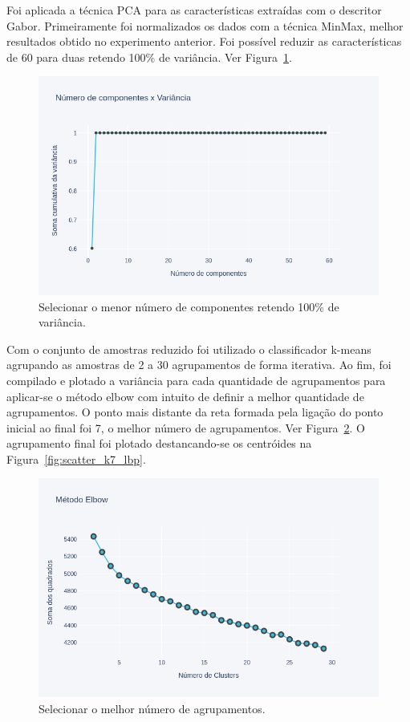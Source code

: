 \documentclass[a4paper, 12 pt, conference]{ieeeconf}  %
\begin{document}
Foi aplicada a técnica PCA para as características extraídas com o descritor Gabor. Primeiramente foi normalizados os dados com a técnica MinMax, melhor resultados obtido no experimento anterior. Foi possível reduzir as características de 60 para duas retendo 100\% de variância. Ver  Figura~\ref{fig:points_pca_gabor}.

\begin{figure}[!htbp]
	\centering
	\includegraphics[width=1.0\linewidth,clip=true,trim=0cm 0cm 0cm 0cm, keepaspectratio=true]{points_pca_gabor.png}
	\caption{Selecionar o menor número de componentes retendo 100\% de variância.}
	\label{fig:points_pca_gabor}
\end{figure}


Com o conjunto de amostras reduzido foi utilizado o classificador k-means agrupando as amostras de 2 a 30 agrupamentos de forma iterativa. Ao fim, foi compilado e plotado a variância para cada quantidade de agrupamentos para aplicar-se o método elbow com intuito de definir a melhor quantidade de agrupamentos. O ponto mais distante da reta formada pela ligação do ponto inicial ao final foi 7, o melhor número de agrupamentos. Ver Figura~\ref{fig:points_elbow_lbp}. O agrupamento final foi plotado destancando-se os centróides na Figura~\ref{fig:scatter_k7_lbp}.

\begin{figure}[!htbp]
	\centering
	\includegraphics[width=1.0\linewidth,clip=true,trim=0cm 0cm 0cm 0cm, keepaspectratio=true]{points_elbow_lbp.png}
	\caption{Selecionar o melhor número de agrupamentos.}
	\label{fig:points_elbow_lbp}
\end{figure}
\end{document}
